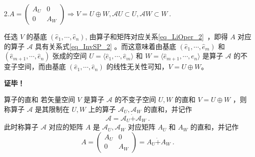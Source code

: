 2.$
A=\begin{pmatrix}
A_U&0\\
0&A_W
\end{pmatrix}\Rightarrow V=U\oplus W,\mathcal{A}U\subset U,\mathcal{A}W\subset W~.
$

任选 $V$ 的基底 $(\hat e_1,\cdots,\hat e_n)$, 由算子和矩阵对应关系\autoref{eq_LiOper_2}~，即得 $A$ 对应的算子 $\mathcal{A}$ 具有关系式\autoref{eq_InvSP_2} 。而这意味着由基底 $(\hat e_1,\cdots,\hat e_m)$ 和 $(\hat e_{m+1},\cdots,\hat e_n)$ 张成的空间 $U=\langle\hat e_1,\cdots,\hat e_m\rangle$ 和 $W=\langle\hat e_{m+1},\cdots,\hat e_n\rangle$ 是算子 $\mathcal{A}$ 的不变子空间，而由基底 $(\hat e_1,\cdots,\hat e_n)$ 的线性无关性可知，$V=U\oplus W$。

\textbf{证毕！}


\begin{definition}{算子的直和}
若矢量空间 $V$ 是算子 $\mathcal{A}$ 的不变子空间 $U,W$ 的直和 $V=U\oplus W$ ，则称算子 $\mathcal{A}$ 是其限制在 $U,W$ 上的算子 $\mathcal{A}_U,\mathcal{A}_W$ 的直和，并记作
\begin{equation}
\mathcal{A}=\mathcal{A}_U\dot{+}\mathcal{A}_W~.
\end{equation}
此时称算子 $\mathcal{A}$ 对应的矩阵 $A$ 是 $\mathcal{A}_U,\mathcal{A}_W$ 对应矩阵 $A_U$ 和 $A_W$ 的直和，并记作
\begin{equation}
A=\begin{pmatrix}
A_U&0\\
0&A_W
\end{pmatrix}=A_U\dot{+}A_W~.
\end{equation}

\end{definition}
